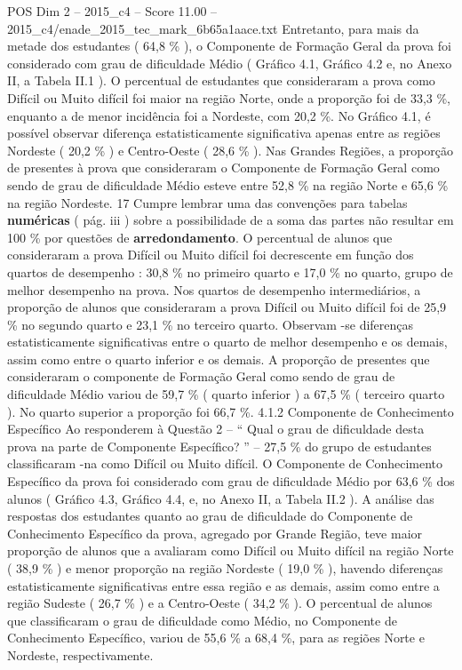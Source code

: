 \begin{textsample}{POS Dim 2 – 2015\_c4 – Score 11.00 – 2015\_c4/enade\_2015\_tec\_mark\_6b65a1aace.txt}
Entretanto, para mais da metade dos estudantes ( 64,8 \% ), o Componente de Formação Geral da prova foi considerado com grau de dificuldade Médio ( Gráfico 4.1, Gráfico 4.2 e, no Anexo II, a Tabela II.1 ).
O percentual de estudantes que consideraram a prova como Difícil ou Muito difícil foi maior na região Norte, onde a proporção foi de 33,3 \%, enquanto a de menor incidência foi a Nordeste, com 20,2 \%.
No Gráfico 4.1, é possível observar diferença estatisticamente significativa apenas entre as regiões Nordeste ( 20,2 \% ) e Centro-Oeste ( 28,6 \% ).
Nas Grandes Regiões, a proporção de presentes à prova que consideraram o Componente de Formação Geral como sendo de grau de dificuldade Médio esteve entre 52,8 \% na região Norte e 65,6 \% na região Nordeste. 17 Cumpre lembrar uma das convenções para tabelas \textbf{numéricas} ( pág. iii ) sobre a possibilidade de a soma das partes não resultar em 100 \% por questões de \textbf{arredondamento}.
O percentual de alunos que consideraram a prova Difícil ou Muito difícil foi decrescente em função dos quartos de desempenho : 30,8 \% no primeiro quarto e 17,0 \% no quarto, grupo de melhor desempenho na prova.
Nos quartos de desempenho intermediários, a proporção de alunos que consideraram a prova Difícil ou Muito difícil foi de 25,9 \% no segundo quarto e 23,1 \% no terceiro quarto.
Observam -se diferenças estatisticamente significativas entre o quarto de melhor desempenho e os demais, assim como entre o quarto inferior e os demais.
A proporção de presentes que consideraram o componente de Formação Geral como sendo de grau de dificuldade Médio variou de 59,7 \% ( quarto inferior ) a 67,5 \% ( terceiro quarto ).
No quarto superior a proporção foi 66,7 \%. 4.1.2 Componente de Conhecimento Específico Ao responderem à Questão 2 – “ Qual o grau de dificuldade desta prova na parte de Componente Específico? ” – 27,5 \% do grupo de estudantes classificaram -na como Difícil ou Muito difícil.
O Componente de Conhecimento Específico da prova foi considerado com grau de dificuldade Médio por 63,6 \% dos alunos ( Gráfico 4.3, Gráfico 4.4, e, no Anexo II, a Tabela II.2 ).
A análise das respostas dos estudantes quanto ao grau de dificuldade do Componente de Conhecimento Específico da prova, agregado por Grande Região, teve maior proporção de alunos que a avaliaram como Difícil ou Muito difícil na região Norte ( 38,9 \% ) e menor proporção na região Nordeste ( 19,0 \% ), havendo diferenças estatisticamente significativas entre essa região e as demais, assim como entre a região Sudeste ( 26,7 \% ) e a Centro-Oeste ( 34,2 \% ).
O percentual de alunos que classificaram o grau de dificuldade como Médio, no Componente de Conhecimento Específico, variou de 55,6 \% a 68,4 \%, para as regiões Norte e Nordeste, respectivamente.

\end{textsample}
